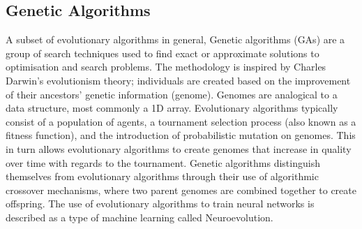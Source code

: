 \documentclass[12pt,a4paper]{article}
\begin{document}
 	\subsection{Genetic Algorithms}

    A subset of evolutionary algorithms in general, Genetic algorithms (GAs) are a group of search techniques used to find exact or approximate solutions to optimisation and search problems. The methodology is inspired by Charles Darwin's evolutionism theory; individuals are created based on the improvement of their ancestors' genetic information (genome). Genomes are analogical to a data structure, most commonly a 1D array. Evolutionary algorithms typically consist of a population of agents, a tournament selection process (also known as a fitness function), and the introduction of probabilistic mutation on genomes. This in turn allows evolutionary algorithms to create genomes that increase in quality over time with regards to the tournament. Genetic algorithms distinguish themselves from evolutionary algorithms through their use of algorithmic crossover mechanisms, where two parent genomes are combined together to create offspring. The use of evolutionary algorithms to train neural networks is described as a type of machine learning called Neuroevolution.

\end{document}
